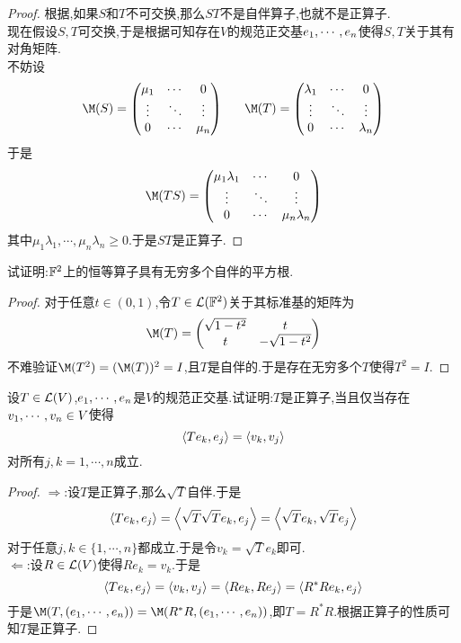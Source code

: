 \documentclass{ctexart}
\begin{document}
\begin{proof}
    根据,如果$S$和$T$不可交换,那么$ST$不是自伴算子,也就不是正算子.\\
    现在假设$S,T$可交换,于是根据可知存在$V$的规范正交基${e}_1,\cdots,{e}_{n}$使得$S,T$关于其有对角矩阵.\\
    不妨设
    \[\M(S)=\begin{pmatrix}
        \mu_1&\cdots&0\\
        \vdots&\ddots&\vdots\\
        0&\cdots&\mu_n
    \end{pmatrix}\ \ \ \ \ 
    \M(T)=\begin{pmatrix}
        \lambda_1&\cdots&0\\
        \vdots&\ddots&\vdots\\
        0&\cdots&\lambda_n
    \end{pmatrix}\]
    于是
    \[\M(TS)=\begin{pmatrix}
        \mu_1\lambda_1&\cdots&0\\
        \vdots&\ddots&\vdots\\
        0&\cdots&\mu_n\lambda_n
    \end{pmatrix}\]
    其中$\mu_1\lambda_1,\cdots,\mu_n\lambda_n\geqslant0$.于是$ST$是正算子.
\end{proof}
\begin{problem}[19.]
    试证明:$\mathbb{F}^2$上的恒等算子具有无穷多个自伴的平方根.
\end{problem}
\begin{proof}
    对于任意$t\in(0,1)$,令$T\in\mathcal{L}(\mathbb{F}^2)$关于其标准基的矩阵为
    \[\M(T)=\begin{pmatrix}
        \sqrt{1-t^2}&t\\t&-\sqrt{1-t^2}
    \end{pmatrix}\]
    不难验证$\M(T^2)=(\M(T))^2=I$,且$T$是自伴的.于是存在无穷多个$T$使得$T^2=I$.
\end{proof}
\begin{problem}[20.]
    设$T\in\mathcal{L}(V)$,${e}_1,\cdots,{e}_{n}$是$V$的规范正交基.试证明:$T$是正算子,当且仅当存在${v}_1,\cdots,{v}_{n}\in V$使得
    \[\left\langle{Te_k},{e_j}\right\rangle=\left\langle{v_k},{v_j}\right\rangle\]
    对所有$j,k=1,\cdots,n$成立.
\end{problem}
\begin{proof}
    $\Rightarrow$:设$T$是正算子,那么$\sqrt{T}$自伴.于是
    \[\left\langle{Te_k},{e_j}\right\rangle=\left\langle{\sqrt{T}\sqrt{T}e_k},{e_j}\right\rangle=\left\langle{\sqrt{T}e_k},{\sqrt{T}e_j}\right\rangle\]
    对于任意$j,k\in\{1,\cdots,n\}$都成立.于是令$v_k=\sqrt{T}e_k$即可.\\
    $\Leftarrow$:设$R\in\mathcal{L}(V)$使得$Re_k=v_k$.于是
    \[\left\langle{Te_k},{e_j}\right\rangle=\left\langle{v_k},{v_j}\right\rangle=\left\langle{Re_k},{Re_j}\right\rangle=\left\langle{R^*Re_k},{e_j}\right\rangle\]
    于是$\M(T,(\li e,n))=\M(R^*R,(\li e,n))$,即$T=R^*R$.根据正算子的性质可知$T$是正算子.
\end{proof}
\end{document}
